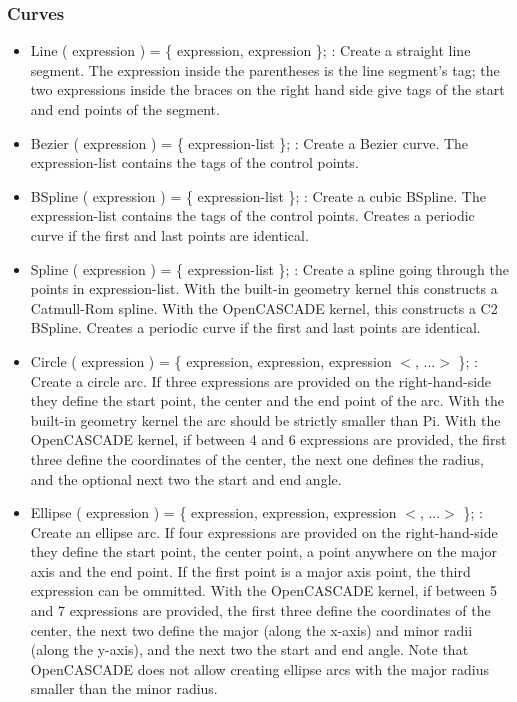\documentclass[dvipdfmx, 9pt, a4paper]{article}
\numberwithin{equation}{section}
\begin{document}
\subsubsection{Curves}
\begin{itemize}
\item Line ( expression ) = \{ expression, expression \}; : Create a straight line segment. The expression inside the parentheses is the line
segment's tag; the two expressions inside the braces on the right hand side give tags of the start and end points of the segment.
\item Bezier ( expression ) = \{ expression-list \}; : Create a Bezier curve. The expression-list contains the tags of the control points.
\item BSpline ( expression ) = \{ expression-list \}; : Create a cubic BSpline. The expression-list contains the tags of the control points. Creates a periodic curve if the first and last points are identical.
\item Spline ( expression ) = \{ expression-list \}; : Create a spline going through the points in expression-list. With the built-in geometry kernel this constructs a Catmull-Rom spline. With the OpenCASCADE kernel, this constructs a C2 BSpline. Creates a periodic curve if the first and last points are identical.
\item Circle ( expression ) = \{ expression, expression, expression $<$, ...$>$ \}; : Create a circle arc. If three expressions are provided on the right-hand-side they define the start point, the center and the end point of the arc. With the built-in geometry kernel the arc should be strictly smaller than Pi. With the OpenCASCADE kernel, if between 4 and 6 expressions are provided, the first three define the coordinates of the center, the next one defines the radius, and the optional next two the start and end angle.
\item Ellipse ( expression ) = \{ expression, expression, expression $<$, ...$>$ \}; : Create an ellipse arc. If four expressions are provided on the right-hand-side they define the start point, the center point, a point anywhere on the major axis and the end point. If the first point is a major axis point, the third expression can be ommitted. With the OpenCASCADE kernel, if between 5 and 7 expressions are provided, the first three define the coordinates of the center, the next two define the major (along the x-axis) and minor radii (along the y-axis), and the next two the start and end angle. Note that OpenCASCADE does not allow creating ellipse arcs with the major radius smaller than the minor radius.

\end{itemize}
\end{document}
